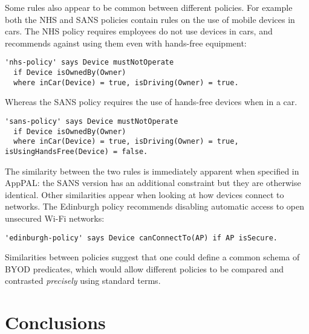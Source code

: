 \documentclass{easychair}
\begin{document}
Some rules also appear to be common between different policies.
For example both the NHS and SANS policies contain rules on the use of mobile devices in cars.
The NHS policy requires employees do not use devices in cars, and recommends against using them even with hands-free equipment:
\begin{lstlisting}[title={\footnotesize\textbf{NHS}:~\itshape ``%
For safety reasons, Trust staff must not use a hand held mobile device whilst driving any vehicle. It is illegal to do so. Please refer to the most up-to-date information via the Highways Agency.  For safety reasons, Trust staff must not use a hand held mobile device whilst driving any vehicle. It is illegal to do so. Please refer to the most up-to-date information via the Highways Agency.''}]
'nhs-policy' says Device mustNotOperate 
  if Device isOwnedBy(Owner)
  where inCar(Device) = true, isDriving(Owner) = true.
\end{lstlisting}
Whereas the SANS policy requires the use of hands-free devices when in a car.
\begin{lstlisting}[title={\footnotesize\textbf{SANS}:~\itshape ``Conducting telephone calls or utilizing handhelds while driving can be a safety hazard. Drivers should use handhelds in hand only while parked or out of the vehicle.
If employees must use a handheld device while driving, ⟨Company⟩ requires the use of hands-free headset devices.''}]
'sans-policy' says Device mustNotOperate 
  if Device isOwnedBy(Owner)
  where inCar(Device) = true, isDriving(Owner) = true, isUsingHandsFree(Device) = false.
\end{lstlisting}
The similarity between the two rules is immediately apparent when specified in AppPAL: the SANS version has an additional constraint but they are otherwise identical.
Other similarities appear when looking at how devices connect to networks.  The Edinburgh policy recommends disabling automatic access to open unsecured Wi-Fi networks:
\begin{lstlisting}[title={\footnotesize\textbf{Edinburgh}:~\itshape ``Control your devices connections by disabling automatic connection to open, unsecured Wi-Fi networks''}]
'edinburgh-policy' says Device canConnectTo(AP) if AP isSecure.
\end{lstlisting}

Similarities between policies suggest that one could define a common schema of BYOD predicates, which would allow different policies to be compared and contrasted \emph{precisely} using standard terms.

\section{Conclusions}





\end{document}
